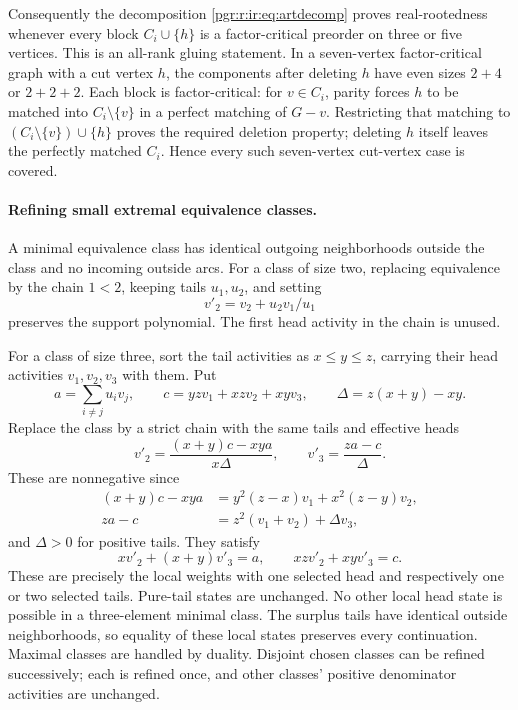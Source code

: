 \documentclass[11pt]{article}
\numberwithin{equation}{section}
\theoremstyle{definition}\newtheorem{definition}[theorem]{Definition}\newtheorem{remark}[theorem]{Remark}
\begin{document}
Consequently the decomposition \eqref{pgr:r:ir:eq:artdecomp} proves real-rootedness whenever every block $C_i\cup\{h\}$ is a factor-critical preorder on three or five vertices. This is an all-rank gluing statement. In a seven-vertex factor-critical graph with a cut vertex $h$, the components after deleting $h$ have even sizes $2+4$ or $2+2+2$. Each block is factor-critical: for $v\in C_i$, parity forces $h$ to be matched into $C_i\setminus\{v\}$ in a perfect matching of $G-v$. Restricting that matching to $(C_i\setminus\{v\})\cup\{h\}$ proves the required deletion property; deleting $h$ itself leaves the perfectly matched $C_i$. Hence every such seven-vertex cut-vertex case is covered.

\paragraph{Refining small extremal equivalence classes.}
A minimal equivalence class has identical outgoing neighborhoods outside the class and no incoming outside arcs. For a class of size two, replacing equivalence by the chain $1<2$, keeping tails $u_1,u_2$, and setting
\begin{equation}\label{pgr:r:ir:eq:block2}
 v'_2=v_2+u_2v_1/u_1
\end{equation}
preserves the support polynomial. The first head activity in the chain is unused.

For a class of size three, sort the tail activities as $x\le y\le z$, carrying their head activities $v_1,v_2,v_3$ with them. Put
\[
 a=\sum_{i\ne j}u_i v_j,\qquad
 c=yzv_1+xzv_2+xyv_3,\qquad
 \Delta=z(x+y)-xy.
\]
Replace the class by a strict chain with the same tails and effective heads
\begin{equation}\label{pgr:r:ir:eq:block3}
 v'_2=\frac{(x+y)c-xy a}{x\Delta},\qquad
 v'_3=\frac{za-c}{\Delta}.
\end{equation}
These are nonnegative since
\begin{align*}
 (x+y)c-xy a&=y^2(z-x)v_1+x^2(z-y)v_2,\\
 za-c&=z^2(v_1+v_2)+\Delta v_3,
\end{align*}
and $\Delta>0$ for positive tails. They satisfy
\[
 xv'_2+(x+y)v'_3=a,
 \qquad xzv'_2+xyv'_3=c.
\]
These are precisely the local weights with one selected head and respectively one or two selected tails. Pure-tail states are unchanged. No other local head state is possible in a three-element minimal class. The surplus tails have identical outside neighborhoods, so equality of these local states preserves every continuation. Maximal classes are handled by duality. Disjoint chosen classes can be refined successively; each is refined once, and other classes' positive denominator activities are unchanged.
\end{document}
